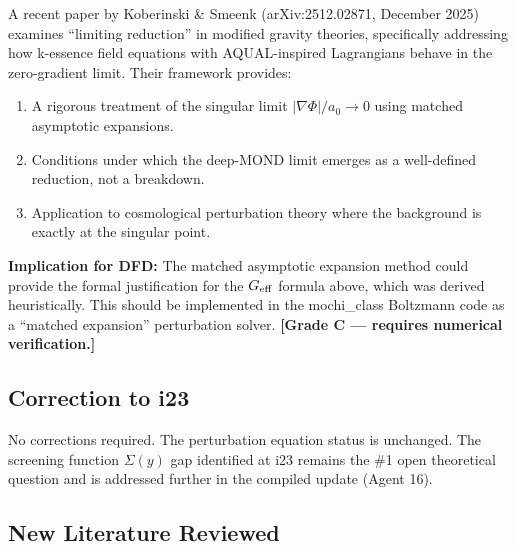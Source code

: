\documentclass[11pt]{article}
\newcommand{\Geff}{G_{\rm eff}}
\newcommand{\aM}{a_0}
\begin{document}
A recent paper by Koberinski \& Smeenk (arXiv:2512.02871, December 2025)
examines ``limiting reduction'' in modified gravity theories, specifically
addressing how k-essence field equations with AQUAL-inspired Lagrangians
behave in the zero-gradient limit. Their framework provides:

\begin{enumerate}[label=(\roman*)]
  \item A rigorous treatment of the singular limit $|\nabla\Phi|/\aM \to 0$
    using matched asymptotic expansions.
  \item Conditions under which the deep-MOND limit emerges as a
    well-defined reduction, not a breakdown.
  \item Application to cosmological perturbation theory where the background
    is exactly at the singular point.
\end{enumerate}

\textbf{Implication for DFD:} The matched asymptotic expansion method
could provide the formal justification for the $\Geff$ formula above,
which was derived heuristically. This should be implemented in the
mochi\_class Boltzmann code as a ``matched expansion'' perturbation solver.
\textbf{[Grade C --- requires numerical verification.]}

\subsection{Correction to i23}

No corrections required. The perturbation equation status is unchanged.
The screening function $\Sigma(y)$ gap identified at i23 remains the
\#1 open theoretical question and is addressed further in the compiled
update (Agent 16).

\subsection{New Literature Reviewed}
\end{document}
